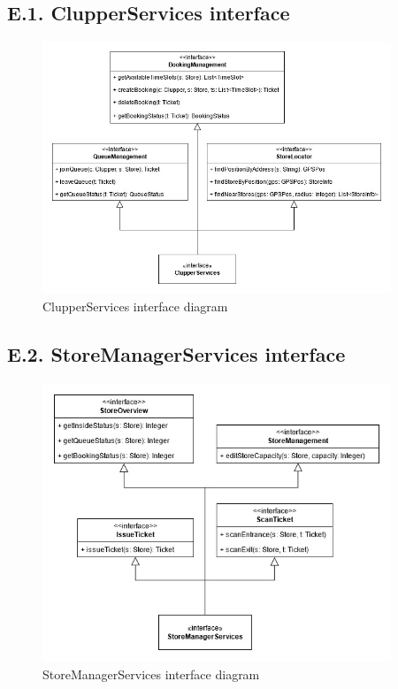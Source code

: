 \subsection{E.1. ClupperServices interface}

\begin{figure}[H]
\centering
\includegraphics[width=0.93\textwidth]{assets/dd/component_interface_diagrams/clupper_component_interface_diagram}
\caption{ClupperServices interface diagram}
\end{figure}

\subsection{E.2. StoreManagerServices interface}

\begin{figure}[H]
\centering
\includegraphics[width=0.93\textwidth]{assets/dd/component_interface_diagrams/store_manager_component_interface_diagram}
\caption{StoreManagerServices interface diagram}
\end{figure}


